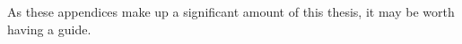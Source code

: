 \documentclass[12pt, a4paper, twoside, openright]{book}
\begin{document}










% 








% 


\appendix
\newpage

\label{appendicies}
As these appendices make up a significant amount of this thesis, it may be worth
having a guide.
\end{document}
